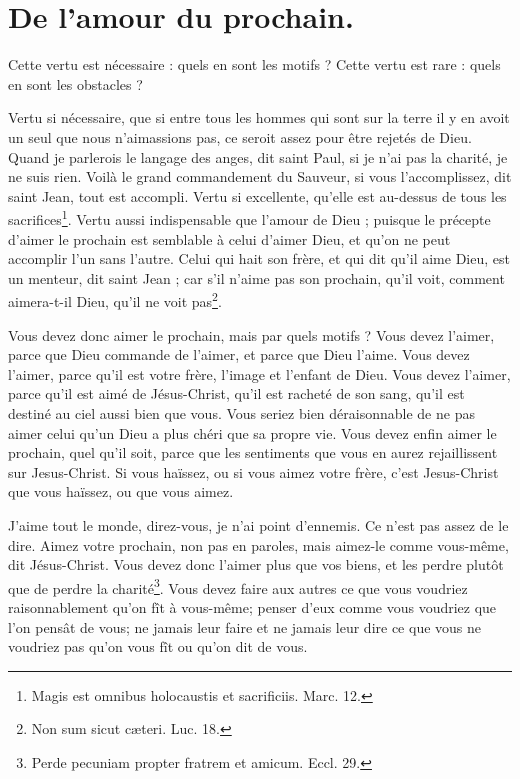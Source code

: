 \documentclass[instructions.tex]{subfiles}
\begin{document}
 
\chapter{De l’amour du prochain.}
 
Cette vertu est nécessaire : quels en sont les motifs ? Cette vertu est rare : quels en sont les obstacles ?
 
\primo Vertu si nécessaire, que si entre tous les hommes qui sont sur la terre il y en avoit un seul que nous n’aimassions pas, ce seroit assez pour être rejetés de Dieu. Quand je parlerois le langage des anges, dit saint Paul, si je n’ai pas la charité, je ne suis rien. Voilà le grand commandement du Sauveur, si vous l’accomplissez, dit saint Jean, tout est accompli. Vertu si excellente, qu’elle est au-dessus de tous les sacrifices\footnote{Magis est omnibus holocaustis et sacrificiis. Marc. 12.}. Vertu aussi indispensable que l’amour de Dieu ; puisque le précepte d’aimer le prochain est semblable à celui d’aimer Dieu, et qu’on ne peut accomplir l’un sans l’autre. Celui qui hait son frère, et qui dit qu’il aime Dieu, est un menteur, dit saint Jean ; car s’il n’aime pas son prochain, qu’il voit, comment aimera-t-il Dieu, qu’il ne voit pas\footnote{Non sum sicut cæteri. Luc. 18.}.
 
Vous devez donc aimer le prochain, mais par quels motifs ? Vous devez l’aimer, parce que Dieu commande de l’aimer, et parce que Dieu l’aime. Vous devez l’aimer, parce qu’il est votre frère, l’image et l’enfant de Dieu. Vous devez l’aimer, parce qu’il est aimé de Jésus-Christ, qu’il est racheté de son sang, qu’il est destiné au ciel aussi bien que vous. Vous seriez bien déraisonnable de ne pas aimer celui qu’un Dieu a plus chéri que sa propre vie. Vous devez enfin aimer le prochain, quel qu’il soit, parce que les sentiments que vous en aurez rejaillissent sur Jesus-Christ. Si vous haïssez, ou si vous aimez votre frère, c’est Jesus-Christ que vous haïssez, ou que vous aimez.
 
J’aime tout le monde, direz-vous, je n’ai point d’ennemis. Ce n’est pas assez de le dire. Aimez votre prochain, non pas en paroles, mais aimez-le comme vous-même, dit Jésus-Christ. Vous devez donc l’aimer plus que vos biens, et les perdre plutôt que de perdre la charité\footnote{Perde pecuniam propter fratrem et amicum. Eccl. 29.}. Vous devez faire aux autres ce que vous voudriez raisonnablement qu’on fît à vous-même; penser d’eux comme vous voudriez que l’on pensât de vous; ne jamais leur faire et ne jamais leur dire ce que vous ne voudriez pas qu’on vous fît ou qu’on dit de vous.
 
\end{document}
